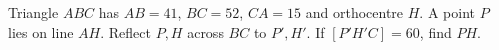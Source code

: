 Triangle $ ABC $ has $ AB=41 $, $ BC=52 $, $ CA=15 $ and orthocentre $ H $. A point $ P $ lies on line $ AH $. Reflect $ P,H $ across $ BC $ to $ P',H'$. If $[P'H'C]=60 $, find $ PH $.
